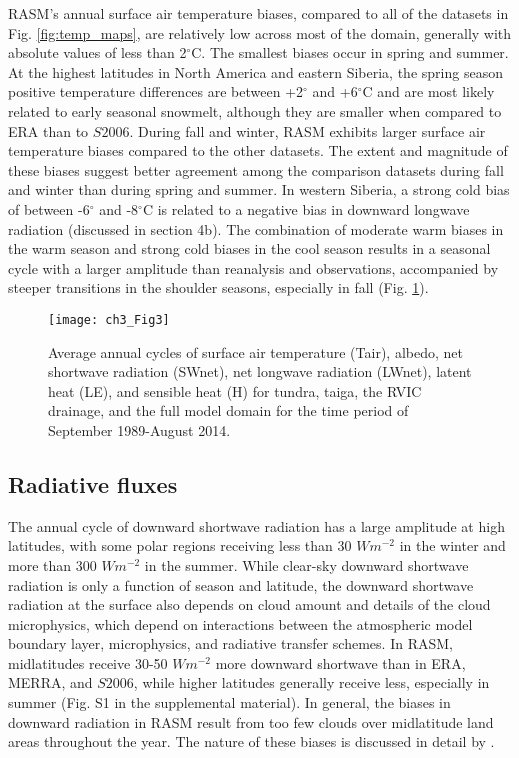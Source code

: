 RASM’s annual surface air temperature biases, compared to all of the datasets in Fig. \ref{fig:temp_maps}, are relatively low across most of the domain, generally with absolute values of less than 2$^{\circ}$C.
The smallest biases occur in spring and summer.
At the highest latitudes in North America and eastern Siberia, the spring season positive temperature differences are between +2$^{\circ}$ and +6$^{\circ}$C and are most likely related to early seasonal snowmelt, although they are smaller when compared to ERA than to $S2006$.
During fall and winter, RASM exhibits larger surface air temperature biases compared to the other datasets.
The extent and magnitude of these biases suggest better agreement among the comparison datasets during fall and winter than during spring and summer.
In western Siberia, a strong cold bias of between -6$^{\circ}$ and -8$^{\circ}$C is related to a negative bias in downward longwave radiation (discussed in section 4b).
The combination of moderate warm biases in the warm season and strong cold biases in the cool season results in a seasonal cycle with a larger amplitude than reanalysis and observations, accompanied by steeper transitions in the shoulder seasons, especially in fall (Fig. \ref{fig:energy_cycle}).

\begin{figure}
  \centering
  \texttt{[image: ch3\_Fig3]}
  \caption{Average annual cycles of surface air temperature (Tair), albedo, net shortwave radiation (SWnet), net longwave radiation (LWnet), latent heat (LE), and sensible heat (H) for tundra, taiga, the RVIC drainage, and the full model domain for the time period of September 1989-August 2014.}
  \label{fig:energy_cycle}
\end{figure}

\subsection{Radiative fluxes}

The annual cycle of downward shortwave radiation has a large amplitude at high latitudes, with some polar regions receiving less than 30 $W m^{-2}$ in the winter and more than 300 $W m^{-2}$ in the summer.
While clear-sky downward shortwave radiation is only a function of season and latitude, the downward shortwave radiation at the surface also depends on cloud amount and details of the cloud microphysics, which depend on interactions between the atmospheric model boundary layer, microphysics, and radiative transfer schemes.
In RASM, midlatitudes receive 30-50 $W m^{-2}$ more downward shortwave than in ERA, MERRA, and $S2006$, while higher latitudes generally receive less, especially in summer (Fig. S1 in the supplemental material).
In general, the biases in downward radiation in RASM result from too few clouds over midlatitude land areas throughout the year.
The nature of these biases is discussed in detail by \citet{Cassano_2016}.

